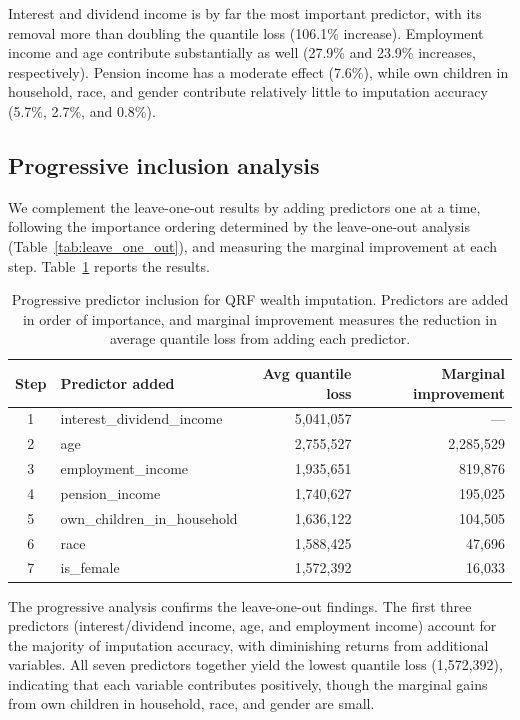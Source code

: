 Interest and dividend income is by far the most important predictor, with its removal more than doubling the quantile loss (106.1\% increase). Employment income and age contribute substantially as well (27.9\% and 23.9\% increases, respectively). Pension income has a moderate effect (7.6\%), while own children in household, race, and gender contribute relatively little to imputation accuracy (5.7\%, 2.7\%, and 0.8\%).

\subsection{Progressive inclusion analysis}

We complement the leave-one-out results by adding predictors one at a time, following the importance ordering determined by the leave-one-out analysis (Table~\ref{tab:leave_one_out}), and measuring the marginal improvement at each step. Table~\ref{tab:progressive_inclusion} reports the results.

\begin{table}[H]
    \centering
    \caption{Progressive predictor inclusion for QRF wealth imputation. Predictors are added in order of importance, and marginal improvement measures the reduction in average quantile loss from adding each predictor.}
    \label{tab:progressive_inclusion}
    \begin{tabular}{clrr}
        \toprule
        Step & Predictor added & Avg quantile loss & Marginal improvement \\
        \midrule
        1 & interest\_dividend\_income & 5,041,057 & --- \\
        2 & age & 2,755,527 & 2,285,529 \\
        3 & employment\_income & 1,935,651 & 819,876 \\
        4 & pension\_income & 1,740,627 & 195,025 \\
        5 & own\_children\_in\_household & 1,636,122 & 104,505 \\
        6 & race & 1,588,425 & 47,696 \\
        7 & is\_female & 1,572,392 & 16,033 \\
        \bottomrule
    \end{tabular}
\end{table}

The progressive analysis confirms the leave-one-out findings. The first three predictors (interest/dividend income, age, and employment income) account for the majority of imputation accuracy, with diminishing returns from additional variables. All seven predictors together yield the lowest quantile loss (1,572,392), indicating that each variable contributes positively, though the marginal gains from own children in household, race, and gender are small.

